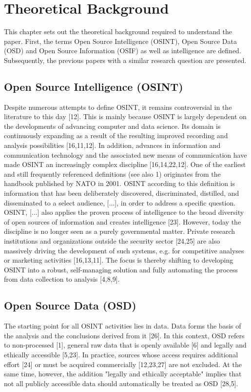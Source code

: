 \documentclass[10pt]{article}
\begin{document}
\section{Theoretical Background}

This chapter sets out the theoretical background required to understand the paper. First, the terms Open Source Intelligence (OSINT), Open Source Data (OSD) and Open Source Information (OSIF) as well as intelligence are defined. Subsequently, the previous papers with a similar research question are presented.

\subsection{Open Source Intelligence (OSINT)}

Despite numerous attempts to define OSINT, it remains controversial in the literature to this day [12]. This is mainly because OSINT is largely dependent on the developments of advancing computer and data science. Its domain is continuously expanding as a result of the resulting improved recording and analysis possibilities [16,11,12]. In addition, advances in information and communication technology and the associated new means of communication have made OSINT an increasingly complex discipline [16,14,22,12]. One of the earliest and still frequently referenced definitions (see also 1) originates from the handbook published by NATO in 2001. OSINT according to this definition is information that has been deliberately discovered, discriminated, distilled, and disseminated to a select audience, [...], in order to address a specific question. OSINT, [...] also applies the proven process of intelligence to the broad diversity of open sources of information and creates intelligence [23]. However, today the discipline is no longer seen as a purely governmental matter. Private research institutions and organizations outside the security sector [24,25] are also massively driving the development of such systems, e.g. for competitive analyses or marketing activities [16,13,11]. The focus is thereby shifting to developing OSINT into a robust, self-managing solution and fully automating the process from data collection to analysis [4,8,9].

\subsection{Open Source Data (OSD)}

The starting point for all OSINT activities lies in data. Data forms the basis of the analysis and the conclusions derived from it [26]. In this context, OSD refers to non-processed [1], general raw data that is openly available [6] and legally and ethically accessible [5,23]. In practice, sources whose access requires additional effort [24] or must be acquired commercially [12,23,27] are not excluded. At the same time, however, the addition "legally and ethically acceptable" implies that not all publicly accessible data should automatically be treated as OSD [28,5].
\end{document}
